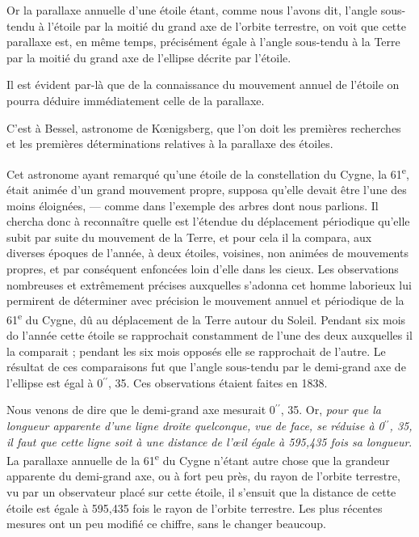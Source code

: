 \documentclass[a4paper, 11pt, oneside]{article}
\begin{document}
Or la parallaxe annuelle d'une étoile étant, comme nous l'avons dit, l'angle sous-tendu à l'étoile par la moitié du grand axe de l'orbite terrestre, on voit que cette parallaxe est, en même temps, précisément égale à l'angle sous-tendu à la Terre par la moitié du grand axe de l'ellipse décrite par l'étoile.

Il est évident par-là que de la connaissance du mouvement annuel de l'étoile on pourra déduire immédiatement celle de la parallaxe.

C'est à Bessel, astronome de Kœnigsberg, que l'on doit les premières recherches et les premières déterminations relatives à la parallaxe des étoiles.

Cet astronome ayant remarqué qu'une étoile de la constellation du Cygne, la 61\textsuperscript{e}, était animée d'un grand mouvement propre, supposa qu'elle devait être l'une des moins éloignées, --- comme dans l'exemple des arbres dont nous parlions. Il chercha donc à reconnaître quelle est l'étendue du déplacement périodique qu'elle subit par suite du mouvement de la Terre, et pour cela il la compara, aux diverses époques de l'année, à deux étoiles, voisines, non animées de mouvements propres, et par conséquent enfoncées loin d'elle dans les cieux. Les observations nombreuses et extrêmement précises auxquelles s'adonna cet homme laborieux lui permirent de déterminer avec précision le mouvement annuel et périodique de la 61\textsuperscript{e} du Cygne, dû au déplacement de la Terre autour du Soleil. Pendant six mois do l'année cette étoile se rapprochait constamment de l'une des deux auxquelles il la comparait ; pendant les six mois opposés elle se rapprochait de l'autre. Le résultat de ces comparaisons fut que l'angle sous-tendu par le demi-grand axe de l'ellipse est égal à 0$^{\prime\prime}$, 35. Ces observations étaient faites en 1838.

Nous venons de dire que le demi-grand axe mesurait 0$^{\prime\prime}$, 35. Or, \emph{pour que la longueur apparente d'une ligne droite quelconque, vue de face, se réduise à 0$^{\prime\prime}$, 35, il faut que cette ligne soit à une distance de l'œil égale à 595,435 fois sa longueur}. La parallaxe annuelle de la 61\textsuperscript{e} du Cygne n'étant autre chose que la grandeur apparente du demi-grand axe, ou à fort peu près, du rayon de l'orbite terrestre, vu par un observateur placé sur cette étoile, il s'ensuit que la distance de cette étoile est égale à 595,435 fois le rayon de l'orbite terrestre. Les plus récentes mesures ont un peu modifié ce chiffre, sans le changer beaucoup.
\end{document}

